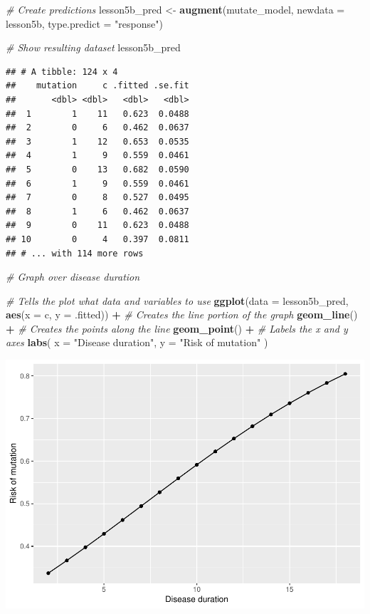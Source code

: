 \documentclass[]{book}
\newenvironment{Shaded}{\begin{snugshade}}{\end{snugshade}}
\newcommand{\CommentTok}[1]{\textcolor[rgb]{0.56,0.35,0.01}{\textit{#1}}}
\newcommand{\DataTypeTok}[1]{\textcolor[rgb]{0.13,0.29,0.53}{#1}}
\newcommand{\KeywordTok}[1]{\textcolor[rgb]{0.13,0.29,0.53}{\textbf{#1}}}
\newcommand{\NormalTok}[1]{#1}
\newcommand{\OperatorTok}[1]{\textcolor[rgb]{0.81,0.36,0.00}{\textbf{#1}}}
\newcommand{\StringTok}[1]{\textcolor[rgb]{0.31,0.60,0.02}{#1}}
\begin{document}
\begin{Shaded}
\begin{Highlighting}[]
\CommentTok{# Create predictions}
\NormalTok{lesson5b_pred <-}
\StringTok{  }\KeywordTok{augment}\NormalTok{(mutate_model,}
          \DataTypeTok{newdata =}\NormalTok{ lesson5b,}
          \DataTypeTok{type.predict =} \StringTok{"response"}\NormalTok{)}

\CommentTok{# Show resulting dataset}
\NormalTok{lesson5b_pred}
\end{Highlighting}
\end{Shaded}

\begin{verbatim}
## # A tibble: 124 x 4
##    mutation     c .fitted .se.fit
##       <dbl> <dbl>   <dbl>   <dbl>
##  1        1    11   0.623  0.0488
##  2        0     6   0.462  0.0637
##  3        1    12   0.653  0.0535
##  4        1     9   0.559  0.0461
##  5        0    13   0.682  0.0590
##  6        1     9   0.559  0.0461
##  7        0     8   0.527  0.0495
##  8        1     6   0.462  0.0637
##  9        0    11   0.623  0.0488
## 10        0     4   0.397  0.0811
## # ... with 114 more rows
\end{verbatim}

\begin{Shaded}
\begin{Highlighting}[]
\CommentTok{# Graph over disease duration}

\CommentTok{# Tells the plot what data and variables to use}
\KeywordTok{ggplot}\NormalTok{(}\DataTypeTok{data =}\NormalTok{ lesson5b_pred, }\KeywordTok{aes}\NormalTok{(}\DataTypeTok{x =}\NormalTok{ c, }\DataTypeTok{y =}\NormalTok{ .fitted)) }\OperatorTok{+}
\StringTok{  }\CommentTok{# Creates the line portion of the graph}
\StringTok{  }\KeywordTok{geom_line}\NormalTok{() }\OperatorTok{+}
\StringTok{  }\CommentTok{# Creates the points along the line}
\StringTok{  }\KeywordTok{geom_point}\NormalTok{() }\OperatorTok{+}
\StringTok{  }\CommentTok{# Labels the x and y axes}
\StringTok{  }\KeywordTok{labs}\NormalTok{(}
    \DataTypeTok{x =} \StringTok{"Disease duration"}\NormalTok{,}
    \DataTypeTok{y =} \StringTok{"Risk of mutation"}
\NormalTok{  )}
\end{Highlighting}
\end{Shaded}

\includegraphics{09-answers_files/figure-latex/week5l-1.pdf}
\end{document}
